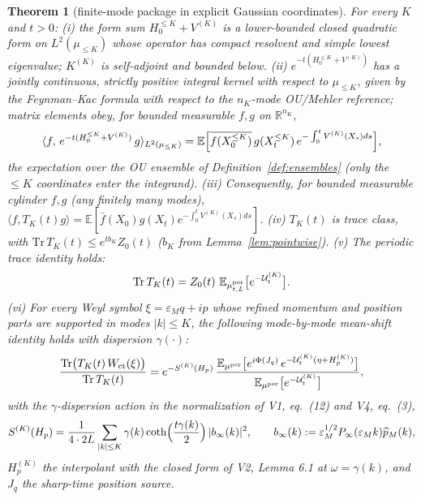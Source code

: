 \documentclass[11pt,a4paper]{article}
\theoremstyle{plain}
\newtheorem{theorem}{Theorem}[section]
\theoremstyle{definition}
\newcommand{\R}{\mathbb{R}}
\newcommand{\E}{\mathbb{E}}
\newcommand{\eps}{\varepsilon}
\newcommand{\U}{\mathcal U}
\newcommand{\ip}[2]{\langle #1,#2\rangle}
\newcommand{\Trace}{\mathrm{Tr}}
\DeclareMathOperator{\cth}{coth}
\newcommand{\muv}{\mu}
\begin{document}
\begin{theorem}[finite-mode package in explicit Gaussian coordinates]
\label{thm:finitemode}
For every $K$ and $t>0$:
\emph{(i)} the form sum $H_0^{\le K}+V^{(K)}$ is a lower-bounded closed
quadratic form on $L^2(\muv_{\le K})$ whose operator has compact
resolvent and simple lowest eigenvalue; $K^{(K)}$ is self-adjoint and
bounded below.
\emph{(ii)} $e^{-t(H_0^{\le K}+V^{(K)})}$ has a jointly continuous,
strictly positive integral kernel with respect to $\muv_{\le K}$, given by
the Feynman--Kac formula with respect to the $n_K$-mode OU/Mehler
reference; matrix elements obey, for bounded measurable $f,g$ on
$\R^{n_K}$,
\begin{equation}
 \ip{f}{\,e^{-t(H_0^{\le K}+V^{(K)})}\,g}_{L^2(\muv_{\le K})}
 =\E\Bigl[\overline{f(X^{\le K}_0)}\,g(X^{\le K}_t)\,
 e^{-\int_0^tV^{(K)}(X_s)ds}\Bigr],
 \label{eq:FKmatrix}
\end{equation}
the expectation over the OU ensemble of Definition~\ref{def:ensembles}
(only the $\le K$ coordinates enter the integrand).
\emph{(iii)} Consequently, for bounded measurable cylinder $f,g$
(any finitely many modes),
$\ip{f}{T_K(t)g}=\E[\bar f(X_0)g(X_t)e^{-\int_0^tV^{(K)}(X_s)ds}]$.
\emph{(iv)} $T_K(t)$ is trace class, with
$\Trace\,T_K(t)\le e^{tb_K}Z_0(t)$ ($b_K$ from
Lemma~\ref{lem:pointwise}).
\emph{(v)} The periodic trace identity holds:
\[
 \Trace\,T_K(t)=Z_0(t)\ \E_{\mu^{\rm per}_{t,L}}
 \bigl[e^{-\U^{(K)}_t}\bigr].
\]
\emph{(vi)} For every Weyl symbol $\xi=\eps_Mq+ip$ whose refined momentum
and position parts are supported in modes $|k|\le K$, the following
mode-by-mode mean-shift identity holds with dispersion $\gamma(\cdot)$:
\begin{equation}
 \frac{\Trace\bigl(T_K(t)\,W_{\rm ct}(\xi)\bigr)}{\Trace\,T_K(t)}
 =e^{-S^{(K)}(H_p)}\,
 \frac{\E_{\mu^{\rm per}}\bigl[e^{i\Phi(J_q)}\,
 e^{-\U^{(K)}_t(\eta+H^{(K)}_p)}\bigr]}
 {\E_{\mu^{\rm per}}\bigl[e^{-\U^{(K)}_t}\bigr]},
 \label{eq:meanshiftK}
\end{equation}
with the $\gamma$-dispersion action in the normalization of V1, eq.\ (12) and
V4, eq.\ (3),
\[
 S^{(K)}(H_p)=\frac1{4\cdot2L}\sum_{|k|\le K}\gamma(k)
 \cth\Bigl(\frac{t\gamma(k)}2\Bigr)\,|b_\infty(k)|^2,
 \qquad b_\infty(k):=\eps_M^{1/2}P_\infty(\eps_Mk)\widehat p_M(k),
\] $H^{(K)}_p$ the interpolant with the closed
form of V2, Lemma 6.1 at $\omega=\gamma(k)$, and $J_q$ the sharp-time
position source.
\end{theorem}
\end{document}
